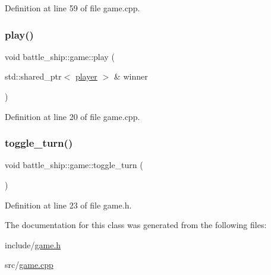 Definition at line 59 of file game.\+cpp.

\mbox{\label{classbattle__ship_1_1game_a8bd311ac1aaab0a16c06b4f1b9664af4}} 
\subsubsection{\texorpdfstring{play()}{play()}}
{\footnotesize\ttfamily void battle\+\_\+ship\+::game\+::play (\begin{DoxyParamCaption}\item[{std\+::shared\+\_\+ptr$<$ \hyperlink{classbattle__ship_1_1player}{player} $>$ \&}]{winner }\end{DoxyParamCaption})}



Definition at line 20 of file game.\+cpp.

\mbox{\label{classbattle__ship_1_1game_a0e5a85f6c1f0cff5e1104545b5222026}} 
\subsubsection{\texorpdfstring{toggle\+\_\+turn()}{toggle\_turn()}}
{\footnotesize\ttfamily void battle\+\_\+ship\+::game\+::toggle\+\_\+turn (\begin{DoxyParamCaption}{ }\end{DoxyParamCaption})\hspace{0.3cm}{\ttfamily [inline]}}



Definition at line 23 of file game.\+h.



The documentation for this class was generated from the following files\+:\begin{DoxyCompactItemize}
\item 
include/\hyperlink{game_8h}{game.\+h}\item 
src/\hyperlink{game_8cpp}{game.\+cpp}\end{DoxyCompactItemize}
